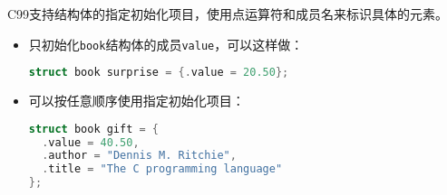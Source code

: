 \begin{frame}[fragile]
C99支持结构体的指定初始化项目，使用点运算符和成员名来标识具体的元素。
\begin{itemize}
\item 只初始化\verb|book|结构体的成员\verb|value|，可以这样做：
  \begin{lstlisting}[language=c,backgroundcolor=\color{red!20}]
struct book surprise = {.value = 20.50};    
  \end{lstlisting}
\item 可以按任意顺序使用指定初始化项目：
  \begin{lstlisting}[language=c,backgroundcolor=\color{red!20}]
struct book gift = {
  .value = 40.50,
  .author = "Dennis M. Ritchie",
  .title = "The C programming language"
};    
  \end{lstlisting}

\end{itemize}
\end{frame}
